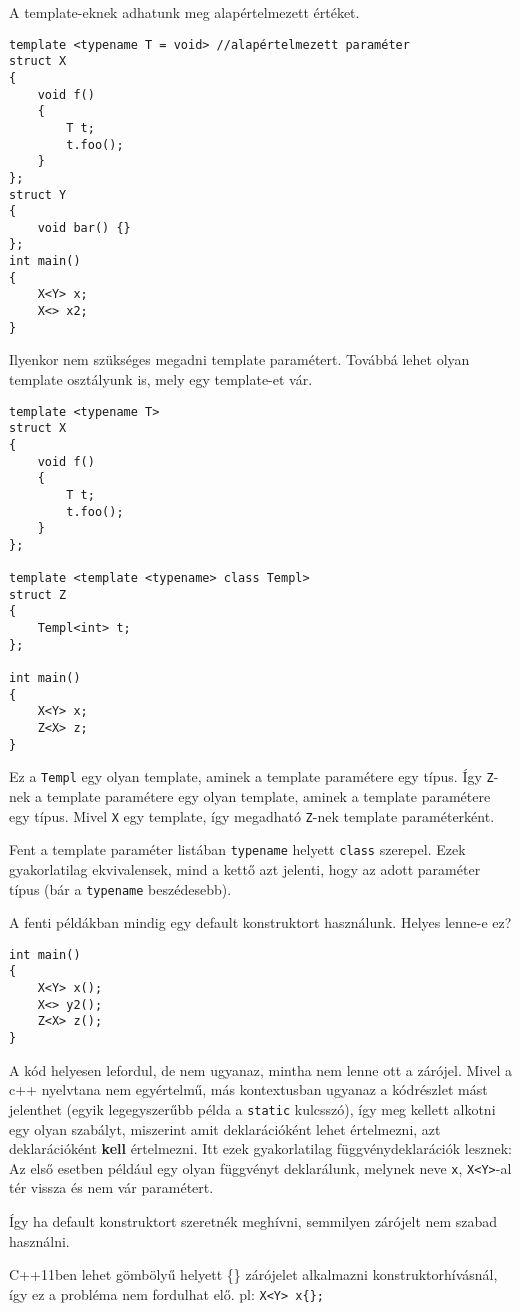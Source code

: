 \documentclass[a4paper,11.5pt,table]{article}
\begin{document}
	A template-eknek adhatunk meg alapértelmezett értéket.

\begin{lstlisting}
template <typename T = void> //alapértelmezett paraméter
struct X
{
	void f()
	{
		T t;
		t.foo();
	}
};
struct Y
{
	void bar() {}
};
int main()
{
	X<Y> x;
	X<> x2;
}
\end{lstlisting}
	Ilyenkor nem szükséges megadni template paramétert. Továbbá lehet olyan template osztályunk is, mely egy template-et vár.

\begin{lstlisting}
template <typename T>
struct X
{
	void f()
	{
		T t;
		t.foo();
	}
};

template <template <typename> class Templ>
struct Z
{
	Templ<int> t;
};

int main()
{
	X<Y> x;
	Z<X> z;
}
\end{lstlisting}
	Ez a \texttt{Templ} egy olyan template, aminek a template paramétere egy típus. Így \texttt{Z}-nek a template paramétere egy olyan template, aminek a template paramétere egy típus. Mivel \texttt{X} egy template, így megadható \texttt{Z}-nek template paraméterként.
	\begin{note}
		Fent a template paraméter listában \texttt{typename} helyett \texttt{class} szerepel. Ezek gyakorlatilag ekvivalensek, mind a kettő azt jelenti, hogy az adott paraméter típus (bár a \texttt{typename} beszédesebb).
	\end{note}
	
	A fenti példákban mindig egy default konstruktort használunk. Helyes lenne-e ez?
\begin{lstlisting}
int main()
{
	X<Y> x();
	X<> y2();
	Z<X> z();
}
\end{lstlisting}
	A kód helyesen lefordul, de nem ugyanaz, mintha nem lenne ott a zárójel. Mivel a c++ nyelvtana nem egyértelmű, más kontextusban ugyanaz a kódrészlet mást jelenthet (egyik legegyszerűbb példa a \texttt{static} kulcsszó), így meg kellett alkotni egy olyan szabályt, miszerint amit deklarációként lehet értelmezni, azt deklarációként \textbf{kell} értelmezni. Itt ezek gyakorlatilag függvénydeklarációk lesznek: Az első esetben például egy olyan függvényt deklarálunk, melynek neve \texttt{x}, \texttt{X<Y>}-al tér vissza és nem vár paramétert. 
	
	Így ha default konstruktort szeretnék meghívni, semmilyen zárójelt nem szabad használni.
	\begin{note}
		C++11ben lehet gömbölyű helyett \{\} zárójelet alkalmazni konstruktorhívásnál, így ez a probléma nem fordulhat elő. pl: \texttt{X<Y> x\{\};}
	\end{note}
	
\end{document}
